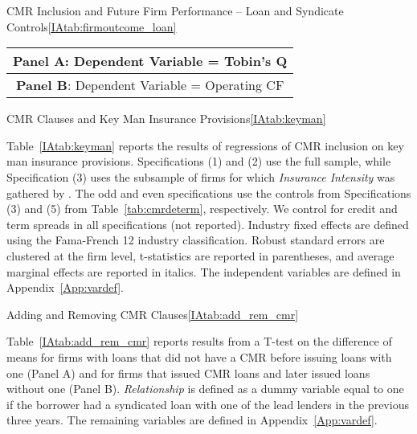 \documentclass[12pt]{article}
\begin{document}
\begin{appendices}
\begin{singlespace}
\begin{landscapepapertable}{CMR Inclusion and Future Firm Performance -- Loan and Syndicate Controls}{\ref{IAtab:firmoutcome_loan}}{\skipline}
    \def\arraystretch{.92}
  \startdata
    \begin{tabular}{l*{10}{c}}
        \toprule
        \multicolumn{11}{c}{\small  \textbf{Panel A}: Dependent Variable = Tobin's Q} \\ \midrule
        
        \midrule \midrule
        \multicolumn{11}{c}{\small  \textbf{Panel B}: Dependent Variable = Operating CF} \\ \midrule
        
        \bottomrule
    \end{tabular}
\end{landscapepapertable}



\begin{papertable}{CMR Clauses and Key Man Insurance Provisions}{\ref{IAtab:keyman}}{}
  \label{IAtab:keyman}

  Table~\ref{IAtab:keyman} reports the results of regressions of CMR inclusion on key man insurance provisions.
  Specifications (1) and (2) use the full sample, while Specification (3) uses the subsample of firms for which \textit{Insurance Intensity} was gathered by \cite{Israelsen_2017}.
  The odd and even specifications use the controls from Specifications (3) and (5) from Table~\ref{tab:cmrdeterm}, respectively.
  We control for credit and term spreads in all specifications (not reported).
  Industry fixed effects are defined using the Fama-French 12 industry classification.
  Robust standard errors are clustered at the firm level, t-statistics are reported in parentheses, and average marginal effects are reported in italics.
  The independent variables are defined in Appendix~\ref{App:vardef}.
  \postamblesig

  \startdata
  
\end{papertable}


\begin{papertable}{Adding and Removing CMR Clauses}{\ref{IAtab:add_rem_cmr}}{}
    \label{IAtab:add_rem_cmr}

    Table~\ref{IAtab:add_rem_cmr} reports results from a T-test on the difference of means for firms with loans that did not have a CMR before issuing loans with one (Panel A) and for firms that issued CMR loans and later issued loans without one (Panel B).
    \textit{Relationship} is defined as a dummy variable equal to one if the borrower had a syndicated loan with one of the lead lenders in the previous three years.
    The remaining variables are defined in Appendix~\ref{App:vardef}.
    \postamblesig


\end{papertable}
\end{singlespace}
\end{appendices}
\end{document}
